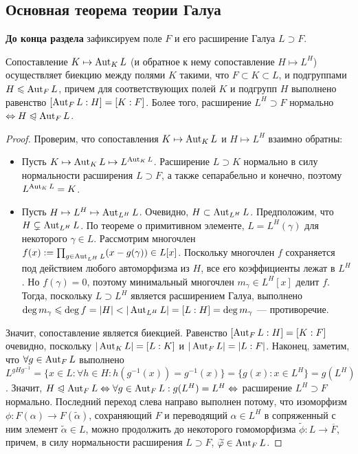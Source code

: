 \subsection{Основная теорема теории Галуа}

\textbf{До конца раздела} зафиксируем поле $F$ и его расширение Галуа $L \supset F$.

\begin{theorem}
	Сопоставление $K \mapsto \operatorname{Aut}_{K}L$ (и обратное к нему сопоставление $H \mapsto L^H$) осуществляет биекцию между полями $K$ такими, что $F \subset K \subset L$, и подгруппами $H \leqslant \operatorname{Aut}_F{L}$, причем для соответствующих полей $K$ и подгрупп $H$ выполнено равенство $[\operatorname{Aut}_FL : H] = [K : F]$. Более того, расширение $L^H \supset F$ нормально $\Leftrightarrow H \trianglelefteqslant \operatorname{Aut}_F{L}$.
\end{theorem}

\begin{proof}
	Проверим, что сопоставления $K \mapsto \operatorname{Aut}_{K}L$ и $H \mapsto L^H$ взаимно обратны:
	\begin{itemize}
		\item Пусть $K \mapsto \operatorname{Aut}_{K}L \mapsto L^{\operatorname{Aut}_{K}L}$. Расширение $L \supset K$ нормально в силу нормальности расширения $L \supset F$, а также сепарабельно и конечно, поэтому $L^{\operatorname{Aut}_K{L}} = K$.
		\item Пусть $H \mapsto L^H \mapsto \operatorname{Aut}_{L^H}L$. Очевидно, $H \subset \operatorname{Aut}_{L^H}L$. Предположим, что $H \subsetneq \operatorname{Aut}_{L^H}L$. По теореме о примитивном элементе, $L = L^H(\gamma)$ для некоторого $\gamma \in L$. Рассмотрим многочлен $f(x) := \prod_{g \in \operatorname{Aut}_{L^H}L}(x - g(\gamma)) \in L[x]$. Поскольку многочлен $f$ сохраняется под действием любого автоморфизма из $H$, все его коэффициенты лежат в $L^H$. Но $f(\gamma) = 0$, поэтому минимальный многочлен $m_\gamma \in L^H[x]$ делит $f$. Тогда, поскольку $L \supset L^H$ является расширением Галуа, выполнено $\deg{m_\gamma} \le \deg{f} = |H| < |\Aut_{L^H}L| \hm= [L : H] = \deg{m_\gamma}$ --- противоречие.
	\end{itemize}
	
	Значит, сопоставление является биекцией. Равенство $[\operatorname{Aut}_FL : H] = [K : F]$ очевидно, поскольку $|\operatorname{Aut}_KL| = [L : K]$ и $|\operatorname{Aut}_FL| = |L : F|$. Наконец, заметим, что $\forall g \in \operatorname{Aut}_FL$ выполнено $L^{gHg^{-1}} = \{x \in L: \forall h \in H: h(g^{-1}(x)) = g^{-1}(x)\}= \{g(x) : x \in L^H\} = g(L^H)$. Значит, $H \trianglelefteqslant \operatorname{Aut}_FL \Leftrightarrow \forall g \in \operatorname{Aut}_FL: g(L^H) = L^H \Leftrightarrow$ расширение $L^H \supset F$ нормально. Последний переход слева направо выполнен потому, что изоморфизм $\phi: F(\alpha) \to F(\widetilde\alpha)$, сохраняющий $F$ и переводящий $\alpha \in L^H$ в сопряженный с ним элемент $\widetilde\alpha \in L$, можно продолжить до некоторого гомоморфизма $\widetilde\phi: L \to \overline{F}$, причем, в силу нормальности расширения $L \supset F$, $\widetilde{\varphi} \in \operatorname{Aut}_FL$.
\end{proof}